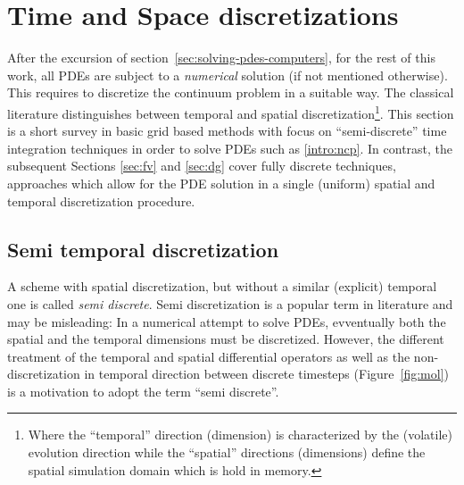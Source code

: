 \section{Time and Space discretizations}
After the excursion of section~\ref{sec:solving-pdes-computers}, for the rest 
of this work, all PDEs are subject to a \emph{numerical} solution (if not 
mentioned otherwise).
This requires to discretize the continuum problem in a suitable way.
The classical literature distinguishes between temporal and spatial
discretization\footnote{
 Where the ``temporal'' direction (dimension) is characterized by the
 (volatile)
 evolution direction while the ``spatial'' directions (dimensions) define
 the spatial simulation domain which is hold in memory.
}.
This section is a short survey in basic grid based methods with focus on
``semi-discrete'' time integration techniques in order to solve PDEs
such as \eqref{intro:ncp}. In contrast, the subsequent
Sections \vref{sec:fv} and \vref{sec:dg} cover fully discrete techniques, \ie
approaches which allow for the PDE solution in a single (uniform) spatial and
temporal discretization procedure.

\subsection{Semi temporal discretization}\label{sec:time-and-mol}
A scheme with spatial discretization, but without a similar
(explicit) temporal one is called \emph{semi discrete}.
Semi discretization is a popular term in literature and may be misleading:
In a numerical attempt to solve PDEs, evventually both the spatial and the
temporal dimensions must be discretized.  However, the different
treatment of the temporal and spatial differential operators as well as the
non-discretization in temporal direction between discrete timesteps
(Figure~\ref{fig:mol})
is a motivation to adopt the term ``semi discrete''.
  
